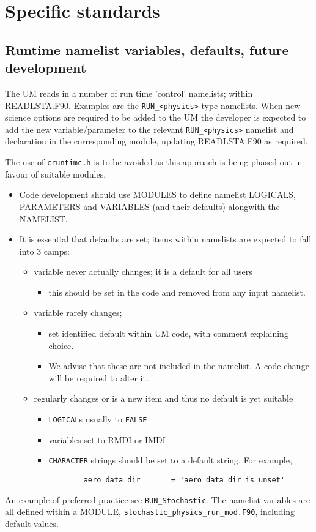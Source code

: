 \section{Specific standards}
\label{sec:specific}

\subsection{Runtime namelist variables, defaults, future development}\label{sec:namelists}
The UM reads in a number of run time 'control' namelists; within READLSTA.F90.
Examples are the \verb|RUN_<physics>| type namelists.
When new science options are required to be added to the UM  the developer is expected to add
the new variable/parameter to the relevant \verb|RUN_<physics>| namelist and declaration in the corresponding module, 
updating READLSTA.F90 as required.

The use of \verb|cruntimc.h| is to be avoided as this approach is being phased out in favour of suitable modules.

\begin{itemize}
  \item Code development should use MODULES to define
namelist LOGICALS, PARAMETERS and VARIABLES (and their defaults) alongwith the
NAMELIST.
\item It is essential that defaults are set; items within namelists are expected to fall into 3 camps: 
\begin{itemize}
  \item variable never actually changes; it is a default for all users
     \begin{itemize} 
     \item this should be set in the code and removed from any input namelist.
     \end{itemize}
  \item variable rarely changes; 
     \begin{itemize} 
     \item set identified default within UM code, with comment explaining choice.
     \item  We advise that these are not included in the namelist. A code change will be required to alter it.
     \end{itemize}
  \item regularly changes or is a new item and thus no default is yet suitable
     \begin{itemize} 
     \item \verb|LOGICAL|s usually to \verb|FALSE|
     \item variables set to RMDI or IMDI
     \item \verb|CHARACTER| strings should be set to a default string. For example,
       \begin{verbatim}
        aero_data_dir       = 'aero data dir is unset' 
       \end{verbatim}
     \end{itemize}
  \end{itemize}
\end{itemize}
An example of preferred practice see \verb|RUN_Stochastic|.
The namelist variables are all defined within a MODULE,
 \verb|stochastic_physics_run_mod.F90|, including default values.
 

